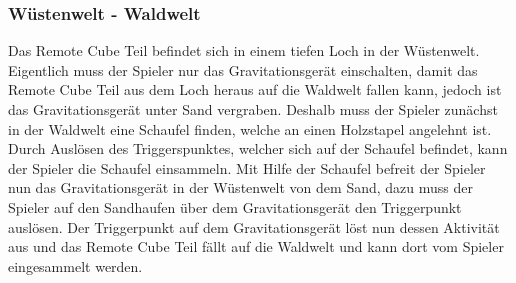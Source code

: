 \subsubsection{Wüstenwelt - Waldwelt}
Das Remote Cube Teil befindet sich in einem tiefen Loch in der Wüstenwelt. Eigentlich muss der Spieler nur das Gravitationsgerät einschalten, damit das Remote Cube Teil aus dem Loch heraus auf die Waldwelt fallen kann, jedoch ist das Gravitationsgerät unter Sand vergraben. Deshalb muss der Spieler zunächst in der Waldwelt eine Schaufel finden, welche an einen Holzstapel angelehnt ist. Durch Auslösen des Triggerspunktes, welcher sich auf der Schaufel befindet, kann der Spieler die Schaufel einsammeln. Mit Hilfe der Schaufel befreit der Spieler nun das Gravitationsgerät in der Wüstenwelt von dem Sand, dazu muss der Spieler auf den Sandhaufen über dem Gravitationsgerät den Triggerpunkt auslösen. Der Triggerpunkt auf dem Gravitationsgerät löst nun dessen Aktivität aus und das Remote Cube Teil fällt auf die Waldwelt und kann dort vom Spieler eingesammelt werden.
